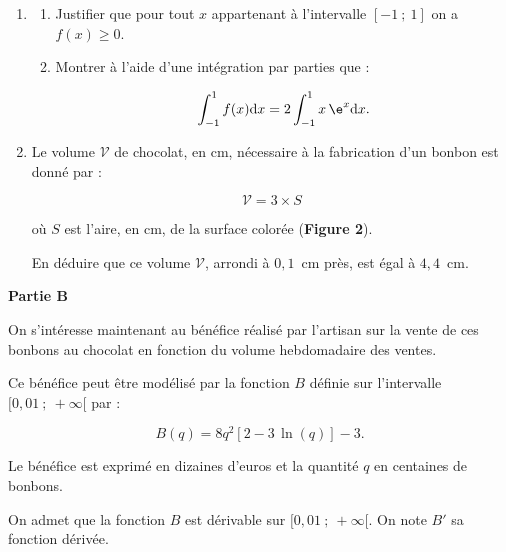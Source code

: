 \begin{enumerate}
\item 
	\begin{enumerate}
		\item Justifier que pour tout $x$ appartenant à l'intervalle $[-1~;~1]$ on a $f(x) \geqslant 0$.
		\item Montrer à l'aide d'une intégration par parties que :
		
\[ \int_{-1}^1 f(x) \text{d}x = 2 \int_{-1}^1 x\,\e^{x} \text{d}x. \]

	\end{enumerate}
\item Le volume $\mathcal{V}$ de chocolat, en cm, nécessaire à la fabrication d'un bonbon est donné par :

\[ \mathcal{V} = 3 \times S \]

où $S$ est l'aire, en cm, de la surface colorée (\textbf{Figure 2}).

En déduire que ce volume $\mathcal{V}$, arrondi à $0,1$~cm près, est égal à $4,4$~cm.
\end{enumerate}

\bigskip

\begin{center}
\textbf{Partie B}
\end{center}

On s'intéresse maintenant au bénéfice réalisé par l'artisan sur la vente de ces bonbons au chocolat en fonction du volume hebdomadaire des ventes.

\smallskip

Ce bénéfice peut être modélisé par la fonction $B$ définie sur l'intervalle $[0,01~;~+\infty[$ par : 

\[B(q) = 8q^2 [2 -3\,\ln(q)] - 3.\]

Le bénéfice est exprimé en dizaines d'euros et la quantité $q$ en centaines de bonbons.

\medskip

On admet que la fonction $B$ est dérivable sur $[0,01~;~+\infty[$. On note $B'$ sa fonction dérivée. 

